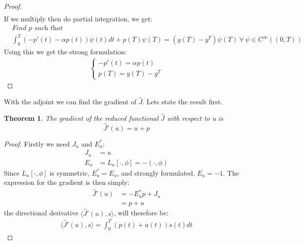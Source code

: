 \documentclass[11pt,a4paper]{article}
\newtheorem{theorem}{Theorem}
\begin{document}
\begin{proof}
\begin{align*}
\end{align*}
If we multiply then do partial integration, we get:
\begin{align*}
&\textit{Find $p$ such that}\\
&\int_0^T(-p'(t)-\alpha p(t))\psi(t)dt +p(T)\psi(T)= (y(T)-y^T)\psi(T)\ \forall \ \psi \in C^{\infty}((0,T))
\end{align*}
Using this we get the strong formulation:
\begin{align*}
   \left\{
     \begin{array}{lr}
       -p'(t) = \alpha p(t) \\
       p(T) = y(T)-y^T
     \end{array}
   \right.
\end{align*}
\end{proof}
With the adjoint we can find the gradient of $\hat{J}$. Lets state the result first.
\begin{theorem}
The gradient of the reduced functional $\hat{J}$ with respect to u is 
$$\hat{J}'(u)=u+p$$
\end{theorem}
\begin{proof}
Firstly we need $J_u$ and $E_u^*$:
\begin{align*}
J_u &= u \\
E_u &= L_u[\cdot,\phi] = -(\cdot,\phi)
\end{align*}
Since $L_u[\cdot,\phi]$ is symmetric, $E_u^*=E_u$, and strongly formulated, $E_u=-1$. The expression for the gradient is then simply:
\begin{align*}
\hat{J}'(u)&=-E_u^*p + J_u \\
&= p+u
\end{align*} 
the directional derivative $\langle\hat{J}'(u),s\rangle$, will therefore be:
\begin{align*}
\langle\hat{J}'(u),s\rangle =\int_0^T(p(t)+u(t))s(t)dt
\end{align*}
\end{proof}
\end{document}

